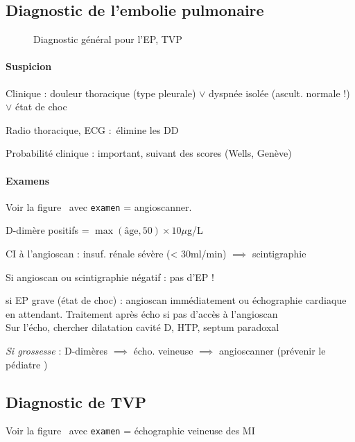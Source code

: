 \subsection{Diagnostic de l'embolie pulmonaire}
\begin{figure}[htpb]
  \label{fig:ep-diag}
  \centering
  \caption{Diagnostic général pour l'EP, TVP}
\end{figure}


\paragraph{Suspicion}
Clinique : douleur thoracique (type pleurale) $\vee$ dyspnée isolée (ascult.
normale !) $\vee$ état de choc

Radio thoracique, ECG : élimine les DD

Probabilité clinique : important, suivant des scores (Wells, Genève)

\paragraph{Examens}
Voir la figure~ avec \texttt{examen} = angioscanner.

D-dimère positifs = $\max(\text{âge}, 50) \times 10 \mu{}$g/L

CI à l'angioscan : insuf. rénale sévère (< 30ml/min) $\implies$ scintigraphie

Si angioscan ou scintigraphie négatif : pas d'EP !

\danger{} si EP grave (état de choc) : angioscan immédiatement ou échographie
cardiaque en attendant. Traitement après écho si pas d'accès à l'angioscan
\skull\\
Sur l'écho, chercher dilatation cavité D, HTP, septum paradoxal

\textit{Si grossesse}  : D-dimères $\implies$ écho. veineuse $\implies$ angioscanner
(prévenir le pédiatre \skull)

\subsection{Diagnostic de TVP}
Voir la figure~ avec \texttt{examen} = échographie veineuse
des MI

